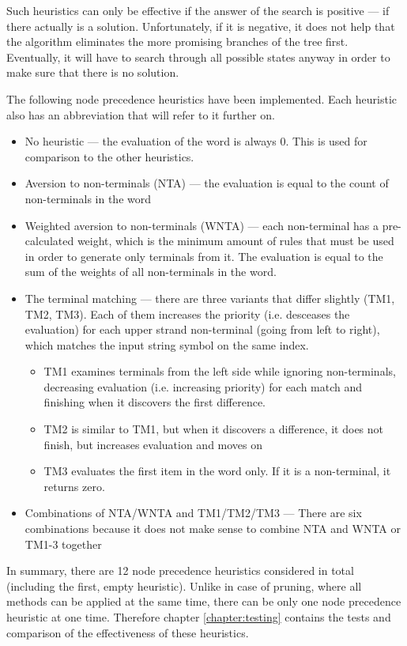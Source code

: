 \begin{enumerate}
Such heuristics can only be effective if the answer of the search is positive --- if there actually is a solution. Unfortunately, if it is negative, it does not help that the algorithm eliminates the more promising branches of the tree first. Eventually, it will have to search through all possible states anyway in order to make sure that there is no solution.

The following node precedence heuristics have been implemented. Each heuristic also has an abbreviation that will refer to it further on.

\begin{itemize}
  \item{No heuristic --- the evaluation of the word is always 0. This is used for comparison to the other heuristics.}
  \item{Aversion to non-terminals (NTA) --- the evaluation is equal to the count of non-terminals in the word}
  \item{Weighted aversion to non-terminals (WNTA) --- each non-terminal has a pre-calculated weight, which is the minimum amount of rules that must be used in order to generate only terminals from it. The evaluation is equal to the sum of the weights of all non-terminals in the word.}
  \item{The terminal matching --- there are three variants that differ slightly (TM1, TM2, TM3). Each of them increases the priority (i.e. desceases the evaluation) for each upper strand non-terminal (going from left to right), which matches the input string symbol on the same index.
  \begin{itemize}
    \item{TM1 examines terminals from the left side while ignoring non-terminals, decreasing evaluation (i.e. increasing priority) for each match and finishing when it discovers the first difference.}
    \item{TM2 is similar to TM1, but when it discovers a difference, it does not finish, but increases evaluation and moves on}
    \item{TM3 evaluates the first item in the word only. If it is a non-terminal, it returns zero.}
  \end{itemize}
  }
  \item{Combinations of NTA/WNTA and TM1/TM2/TM3 --- There are six combinations because it does not make sense to combine NTA and WNTA or TM1-3 together}
\end{itemize}

In summary, there are 12 node precedence heuristics considered in total (including the first, empty heuristic). Unlike in case of pruning, where all methods can be applied at the same time, there can be only one node precedence heuristic at one time. Therefore chapter \ref{chapter:testing} contains the tests and comparison of the effectiveness of these heuristics.
\end{enumerate}

